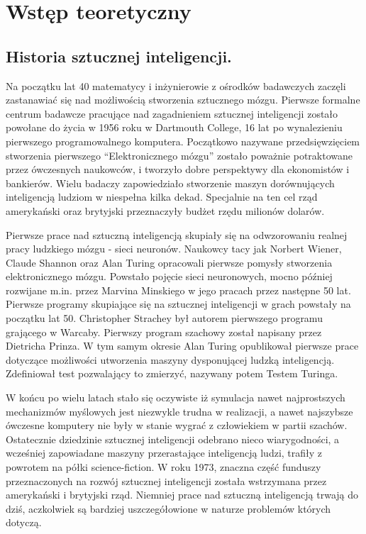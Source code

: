 \chapter{Wstęp teoretyczny}

\section{Historia sztucznej inteligencji.}
\begin{par}
Na początku lat 40 matematycy i inżynierowie z ośrodków badawczych zaczęli zastanawiać się nad możliwością stworzenia sztucznego mózgu.
Pierwsze formalne centrum badawcze pracujące nad zagadnieniem sztucznej inteligencji zostało powołane do życia w 1956 roku w Dartmouth College, 16 lat po wynalezieniu pierwszego programowalnego komputera.
Początkowo nazywane przedsięwzięciem stworzenia pierwszego ``Elektronicznego mózgu'' zostało poważnie potraktowane przez ówczesnych naukowców, i tworzyło dobre perspektywy dla ekonomistów i bankierów.
Wielu badaczy zapowiedziało stworzenie maszyn dorównujących inteligencją ludziom w niespełna kilka dekad.
Specjalnie na ten cel rząd amerykański oraz brytyjski przeznaczyły budżet rzędu milionów dolarów.
\end{par}
\begin{par}
Pierwsze prace nad sztuczną inteligencją skupiały się na odwzorowaniu realnej pracy ludzkiego mózgu - sieci neuronów.
Naukowcy tacy jak Norbert Wiener, Claude Shannon oraz Alan Turing opracowali pierwsze pomysły stworzenia elektronicznego mózgu.
Powstało pojęcie sieci neuronowych, mocno później rozwijane m.in. przez Marvina Minskiego w jego pracach przez następne 50 lat.
Pierwsze programy skupiające się na sztucznej inteligencji w grach powstały na początku lat 50. Christopher Strachey był autorem pierwszego programu grającego w Warcaby.
Pierwszy program szachowy został napisany przez Dietricha Prinza.
W tym samym okresie Alan Turing opublikował pierwsze prace dotyczące możliwości utworzenia maszyny dysponującej ludzką inteligencją.
Zdefiniował test pozwalający to zmierzyć, nazywany potem Testem Turinga.
\end{par}
\begin{par}
W końcu po wielu latach stało się oczywiste iż symulacja nawet najprostszych mechanizmów myślowych jest niezwykle trudna w realizacji, a nawet najszybsze ówczesne komputery nie były w stanie wygrać z człowiekiem w partii szachów. 
Ostatecznie dziedzinie sztucznej inteligencji odebrano nieco wiarygodności, a wcześniej zapowiadane maszyny przerastające inteligencją ludzi, trafiły z powrotem na półki science-fiction. W roku 1973, znaczna część funduszy przeznaczonych na rozwój sztucznej inteligencji została wstrzymana przez amerykański i brytyjski rząd.
Niemniej prace nad sztuczną inteligencją trwają do dziś, aczkolwiek są bardziej uszczegółowione w naturze problemów których dotyczą.
\end{par}


